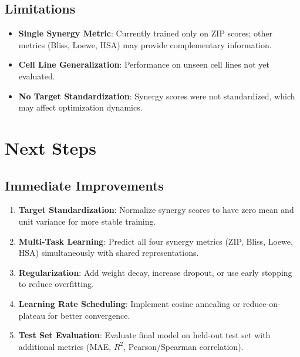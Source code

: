\documentclass[10pt,twocolumn]{article}
\begin{document}
\subsection{Limitations}

\begin{itemize}
    \item \textbf{Single Synergy Metric}: Currently trained only on ZIP scores; other metrics (Bliss, Loewe, HSA) may provide complementary information.
    
    \item \textbf{Cell Line Generalization}: Performance on unseen cell lines not yet evaluated.
    
    \item \textbf{No Target Standardization}: Synergy scores were not standardized, which may affect optimization dynamics.
\end{itemize}

\section{Next Steps}

\subsection{Immediate Improvements}

\begin{enumerate}
    \item \textbf{Target Standardization}: Normalize synergy scores to have zero mean and unit variance for more stable training.
    
    \item \textbf{Multi-Task Learning}: Predict all four synergy metrics (ZIP, Bliss, Loewe, HSA) simultaneously with shared representations.
    
    \item \textbf{Regularization}: Add weight decay, increase dropout, or use early stopping to reduce overfitting.
    
    \item \textbf{Learning Rate Scheduling}: Implement cosine annealing or reduce-on-plateau for better convergence.
    
    \item \textbf{Test Set Evaluation}: Evaluate final model on held-out test set with additional metrics (MAE, $R^2$, Pearson/Spearman correlation).
\end{enumerate}
\end{document}
